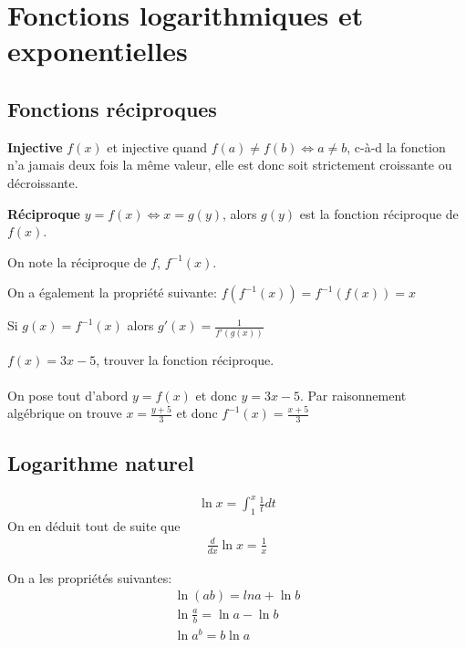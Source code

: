 \chapter{Fonctions logarithmiques et exponentielles}
\section{Fonctions réciproques}

\begin{myDefinition}
	\textbf{Injective} $f(x)$ et injective quand $f(a)\neq f(b)\Leftrightarrow a\neq b$, c-à-d la fonction n'a jamais deux fois la même valeur, elle est donc soit strictement croissante ou décroissante.
\end{myDefinition}

\begin{myDefinition}
	\textbf{Réciproque} $y=f(x) \Leftrightarrow x=g(y)$, alors $g(y)$ est la fonction réciproque de $f(x)$.

On note la réciproque de $f$, $f^{-1}(x)$.

On a également la propriété suivante: $f(f^{-1}(x))=f^{-1}(f(x))=x$

Si $g(x)=f^{-1}(x)$ alors $g'(x)=\frac{1}{f'(g(x))}$
\end{myDefinition}

\begin{myExample}
	$f(x)=3x-5$, trouver la fonction réciproque.\\\\
	On pose tout d'abord $y=f(x)$ et donc $y=3x-5$. Par raisonnement algébrique on trouve $x=\frac{y+5}{3}$ et donc $f^{-1}(x)=\frac{x+5}{3}$
\end{myExample}
\section{Logarithme naturel}
\begin{myDefinition}
	\begin{eqnarray}
		\ln{x}=\int_1^x\frac{1}{t}dt
	\end{eqnarray}
	On en déduit tout de suite que
	\begin{eqnarray}
		\frac{d}{dx}\ln{x}=\frac{1}{x}
	\end{eqnarray}
\end{myDefinition}

On a les propriétés suivantes:
\begin{eqnarray}
	\ln{(ab)}=ln{a}+\ln{b}
	\\
	\ln{\frac{a}{b}}=\ln{a}-\ln{b}
	\\
	\ln{a^b}=b\ln{a}
\end{eqnarray}
